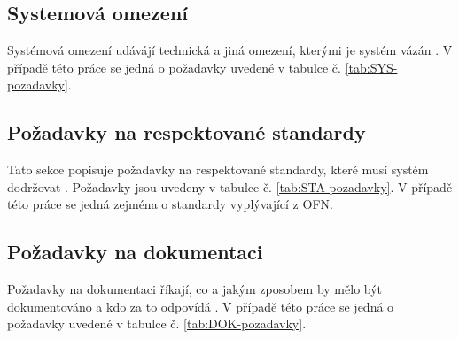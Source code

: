 \subsection{Systemová omezení}

Systémová omezení udávájí technická a jiná omezení, kterými je systém vázán \parencite{rejnkovaLokalizacePrizpusobeniMetodiky}. V případě této práce se jedná o požadavky uvedené v tabulce č. \ref{tab:SYS-pozadavky}.

\subsection{Požadavky na respektované standardy}

Tato sekce popisuje požadavky na respektované standardy, které musí systém dodržovat \parencite{rejnkovaLokalizacePrizpusobeniMetodiky}. Požadavky jsou uvedeny v tabulce č. \ref{tab:STA-pozadavky}. V případě této práce se jedná zejména o standardy vyplývající z OFN.

\subsection{Požadavky na dokumentaci}

Požadavky na dokumentaci říkají, co a jakým zposobem by mělo být dokumentováno a kdo za to odpovídá \parencite{rejnkovaLokalizacePrizpusobeniMetodiky}. V případě této práce se jedná o požadavky uvedené v tabulce č. \ref{tab:DOK-pozadavky}.



